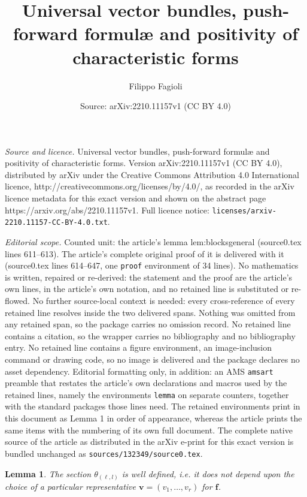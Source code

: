 \documentclass[10pt,a4paper]{amsart}
\title{Universal vector bundles, push-forward formul{\ae} and positivity of characteristic forms}
\author{Filippo Fagioli}
\date{Source: arXiv:2210.11157v1 (CC BY 4.0)}
\newtheorem{lemma}{Lemma}
\begin{document}
\maketitle

\noindent\emph{Source and licence.} Universal vector bundles, push-forward formul{\ae} and positivity of characteristic forms. Version arXiv:2210.11157v1 (CC BY 4.0), distributed by arXiv under the Creative Commons Attribution 4.0 International licence, http://creativecommons.org/licenses/by/4.0/, as recorded in the arXiv licence metadata for this exact version and shown on the abstract page https://arxiv.org/abs/2210.11157v1. Full licence notice: \texttt{licenses/arxiv-2210.11157-CC-BY-4.0.txt}.\par\smallskip

\noindent\textit{Editorial scope.} Counted unit: the article's lemma lem:blocksgeneral (source0.tex lines 611--613). The article's complete original proof of it is delivered with it (source0.tex lines 614--647, one \texttt{proof} environment of 34 lines). No mathematics is written, repaired or re-derived: the statement and the proof are the article's own lines, in the article's own notation, and no retained line is substituted or re-flowed.  No further source-local context is needed: every cross-reference of every retained line resolves inside the two delivered spans.  Nothing was omitted from any retained span, so the package carries no omission record.  No retained line contains a citation, so the wrapper carries no bibliography and no bibliography entry.  No retained line contains a figure environment, an image-inclusion command or drawing code, so no image is delivered and the package declares no asset dependency.  Editorial formatting only, in addition: an AMS \texttt{amsart} preamble that restates the article's own declarations and macros used by the retained lines, namely the environments \texttt{lemma} on separate counters, together with the standard packages those lines need.  The retained environments print in this document as Lemma 1 in order of appearance, whereas the article prints the same items with the numbering of its own full document.  The complete native source of the article as distributed in the arXiv e-print for this exact version is bundled unchanged as \texttt{sources/132349/source0.tex}.
\begin{lemma}\label{lem:blocksgeneral}
	The section $ \theta_{(\ell,l)} $ is well defined, \textsl{i.e.} it does not depend upon the choice of a particular representative $ \mathbf v= (v_1,\dots,v_r) $ for $ \mathbf{f} $.
\end{lemma}
\end{document}
